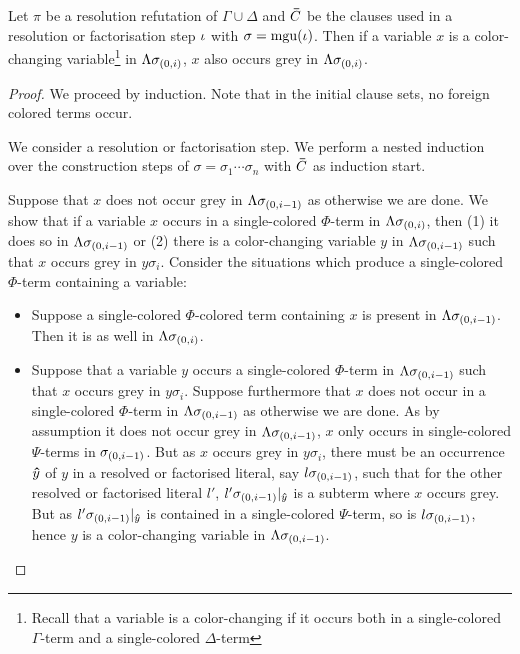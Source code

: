 \documentclass[,%
	draft=false,%
	numbers=noendperiod
	11pt,
	a4paper,
	oneside,%
	openany,
]{memoir}
\begin{document}
\begin{lemma}
	\label{lemma:color_change}
	Let $\pi$ be a resolution refutation of $\Gamma \cup \Delta$ and $\bm\bar C$ be the clauses used in a resolution or factorisation step $\iota$ with $\sigma = \operatorname{mgu}(\iota)$.
	Then if a variable $x$ is a color-changing variable\footnote{Recall that a variable is a color-changing if it occurs both in a single-colored $\Gamma$-term and a single-colored $\Delta$-term}
	in $\Lambda\sigma_{(0,i)}$,
	$x$ also occurs grey 
	in $\Lambda\sigma_{(0,i)}$.
\end{lemma}
\begin{proof}
	We proceed by induction. Note that in the initial clause sets, no foreign colored terms occur.

	We consider a resolution or factorisation step.
	We perform a nested induction over the construction steps of $\sigma = \sigma_1 \cdots \sigma_n$ with $\bm\bar C$ as induction start.

	Suppose that $x$ does not occur grey in $\Lambda\sigma_{(0,i-1)}$ as otherwise we are done.
	We show that if a variable $x$ occurs in a single-colored $\Phi$-term in $\Lambda\sigma_{(0,i)}$, then (1) it does so in $\Lambda\sigma_{(0,i-1)}$ or (2) there is a color-changing variable $y$ in $\Lambda\sigma_{(0,i-1)}$ such that $x$ occurs grey in $y\sigma_i$.
	Consider the situations which produce a single-colored $\Phi$-term containing a variable:
	\begin{itemize}
		\item Suppose a single-colored $\Phi$-colored term containing $x$ is present in $\Lambda\sigma_{(0,i-1)}$. Then it is as well in $\Lambda\sigma_{(0,i)}$.
		\item Suppose that a variable $y$ occurs a single-colored $\Phi$-term in $\Lambda\sigma_{(0,i-1)}$ such that $x$ occurs grey in $y\sigma_i$.
			Suppose furthermore that $x$ does not occur in a single-colored $\Phi$-term in $\Lambda\sigma_{(0,i-1)}$ as otherwise we are done.
			As by assumption it does not occur grey in $\Lambda\sigma_{(0,i-1)}$, $x$ only occurs in single-colored $\Psi$-terms in $\sigma_{(0,i-1)}$.
			But as $x$ occurs grey in $y\sigma_i$, there must be an occurrence $\bm\hat y$ of $y$ in a resolved or factorised literal, say $l\sigma_{(0,i-1)}$, such that for the other resolved or factorised literal $l'$, $l'\sigma_{(0,i-1)}|_{\bm\hat y}$ is a subterm where $x$ occurs grey.
			But as $l'\sigma_{(0,i-1)}|_{\bm\hat y}$ is contained in a single-colored $\Psi$-term, so is $l\sigma_{(0,i-1)}$, hence $y$ is a color-changing variable in $\Lambda\sigma_{(0,i-1)}$. 


\end{itemize}
\end{proof}
\end{document}
